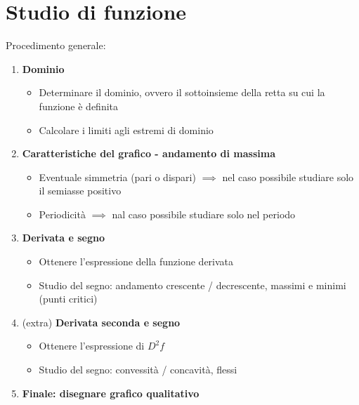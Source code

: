 \documentclass[10pt, oneside]{book}
\theoremstyle{plain}
\begin{document}
\chapter{Studio di funzione}
Procedimento generale:
\begin{enumerate}
    \item \textbf{Dominio} 
    \begin{itemize}
    \item Determinare il dominio, ovvero il sottoinsieme della retta su cui la funzione è definita 
    \item Calcolare i limiti agli estremi di dominio
    \end{itemize}
    \item \textbf{Caratteristiche del grafico - andamento di massima}
    \begin{itemize}
        \item Eventuale simmetria (pari o dispari) $\implies$ nel caso possibile studiare solo il semiasse positivo 
        \item Periodicità $\implies$ nal caso possibile studiare solo nel periodo
    \end{itemize}
    \item \textbf{Derivata e segno}
    \begin{itemize}
        \item Ottenere l'espressione della funzione derivata
        \item Studio del segno: andamento crescente / decrescente, massimi e minimi (punti critici)
    \end{itemize}
    \item (extra) \textbf{Derivata seconda e segno}
    \begin{itemize}
        \item Ottenere l'espressione di $D^2f$
        \item Studio del segno: convessità / concavità, flessi
    \end{itemize}
    \item \textbf{Finale: disegnare grafico qualitativo}
\end{enumerate}
\end{document}
